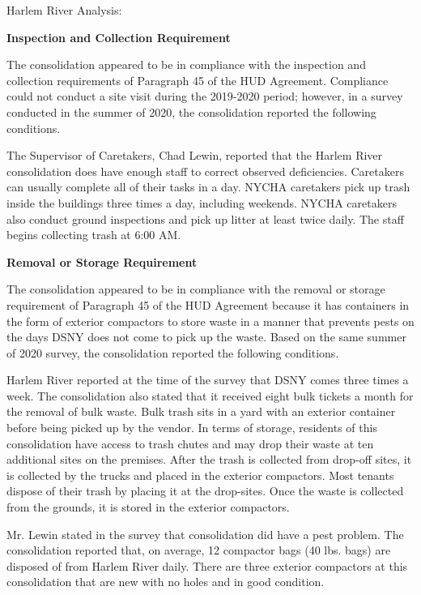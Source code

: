 Harlem River Analysis: 

\textbf{Inspection and Collection Requirement} 

 

The consolidation appeared to be in compliance with the inspection and collection requirements of Paragraph 45 of the HUD Agreement. Compliance could not conduct a site visit during the 2019-2020 period; however, in a survey conducted in the summer of 2020, the consolidation reported the following conditions.

The Supervisor of Caretakers, Chad Lewin, reported that the Harlem River consolidation does have enough staff to correct observed deficiencies. Caretakers can usually complete all of their tasks in a day. NYCHA caretakers pick up trash inside the buildings three times a day, including weekends. NYCHA caretakers also conduct ground inspections and pick up litter at least twice daily. The staff begins collecting trash at 6:00 AM.

\textbf{Removal or Storage Requirement} 

The consolidation appeared to be in compliance with the removal or storage requirement of Paragraph  45 of the HUD Agreement because it has containers in the form of exterior compactors to store waste in a manner that prevents pests on the days DSNY does not come to pick up the waste. Based on the same summer of  2020  survey, the consolidation reported the following conditions.

  

Harlem River reported at the time of the survey that DSNY comes three times a week. The consolidation also stated that it received eight bulk tickets a month for the removal of bulk waste. Bulk trash sits in a yard with an exterior container before being picked up by the vendor. In terms of storage, residents of this consolidation have access to trash chutes and may drop their waste at ten additional sites on the premises. After the trash is collected from drop-off sites, it is collected by the trucks and placed in the exterior compactors.  Most tenants dispose of their trash by placing it at the drop-sites. Once the waste is collected from the grounds, it is stored in the exterior compactors.  

 

Mr. Lewin stated in the survey that consolidation did have a pest problem. The consolidation reported that, on average, 12 compactor bags (40 lbs. bags)  are disposed of from Harlem River daily. There are three exterior compactors at this consolidation that are new with no holes and in good condition.

